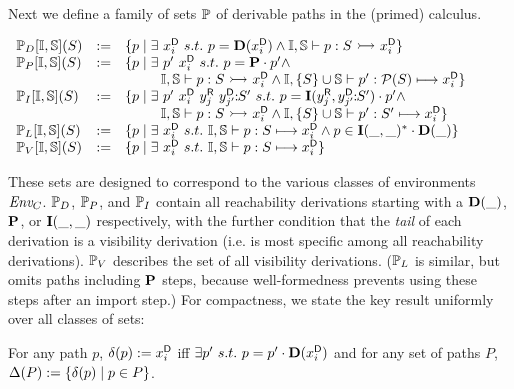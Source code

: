Next we define a family of sets $\mathbb{P}_{}$ of derivable paths in the (primed) calculus. 
\begin{definition}\vspace*{-.3\baselineskip}
  \begin{center}
$
\begin{array}{lll}
  \paths{D}{\seeni}{\seens}{S} & := & \{ p \mid \exists\ \di{x}{i}\ s.t.\  p = \dstep{\di{x}{i}} \wedge \seeni,\seens \vdash p : S \reach \di{x}{i}\}\\
  \paths{P}{\seeni}{\seens}{S} & := & \{ p \mid \exists\ p'\ \di{x}{i}\ s.t.\ p = \pstep \cdot p'\wedge \\
  & & \tab\tab\tab \seeni,\seens \vdash p : S \reach \di{x}{i} \wedge \seeni,\{S\}\cup\seens \vdash p' : \P{S} \resolve \di{x}{i} \} \\
  \paths{I}{\seeni}{\seens}{S} & := & \{ p \mid \exists\ p'\ \di{x}{i}\ \ri{y}{j}\ \dsi{y}{j'}{S'}\ s.t.\ p = \istep{\ri{y}{j}}{\dsi{y}{j'}{S'}}  \cdot p' \wedge \\
  & & \tab\tab\tab\seeni,\seens \vdash p : S \reach \di{x}{i} \wedge \seeni,\{S\}\cup\seens \vdash p' : S' \resolve \di{x}{i} \}
\\
  \paths{L}{\seeni}{\seens}{S} & := &  \{ p \mid  \exists\ \di{x}{i}\ s.t.\ \seeni,\seens \vdash p : S \resolve \di{x}{i} \wedge p \in \istep{\_}{\_}^*\cdot \dstep{\_}\}\\
  \paths{V}{\seeni}{\seens}{S} & := &  \{ p \mid  \exists\ \di{x}{i}\ s.t.\ \seeni,\seens \vdash p : S \resolve \di{x}{i} \}\\
\end{array}
$    
  \end{center}
\label{def:pathsets}
\end{definition}
\vspace*{-.4\baselineskip}
These sets are designed to correspond to the various classes of environments $\mbox{\it{Env}}_{C}$.
$\mathbb{P}_{D}$, $\mathbb{P}_{P}$, and $\mathbb{P}_{I}$ contain all reachability 
derivations starting with a $\mbox{\rm\bf{D}}(\_)$, $\mbox{\rm\bf{P}}$, or $\mbox{\rm\bf{I}}(\_,\_)$ respectively, 
with the further condition that the \emph{tail} of each derivation is 
a visibility derivation (i.e. is most specific among all reachability derivations).
$\mathbb{P}_{V}$ describes the set of all visibility derivations. ($\mathbb{P}_{L}$ is similar, but omits paths including $\mbox{\rm\bf{P}}$ steps, because well-formedness 
prevents using these steps after an import step.) For compactness, we state the key result uniformly over all classes of sets:
\begin{definition} For any path $p$, $\delta(p) := {x}^{\mbox{\scriptsize\sf D}}_{i}$ iff $\exists p'\ s.t.\ p = p' \cdot \mbox{\rm\bf{D}}({x}^{\mbox{\scriptsize\sf D}}_{i})$
and for any set of paths $P$, $\Delta(P) := \{ \delta(p) \mid p \in P\}$.
\end{definition}

